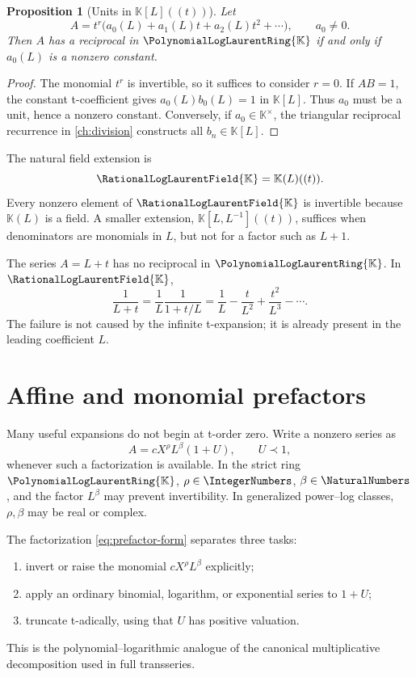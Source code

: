 \documentclass[11pt,openany]{book}
\theoremstyle{definition}
\theoremstyle{plain}
\newtheorem{proposition}{Proposition}[chapter]
\theoremstyle{remark}
\newcommand{\K}{\mathbb{K}}
\begin{document}
\begin{proposition}[{Units in \(\K[L]((t))\)}]\label{prop:units}
Let
\[
 A=t^r\bigl(a_0(L)+a_1(L)t+a_2(L)t^2+\cdots\bigr),
 \qquad a_0\ne0.
\]
Then \(A\) has a reciprocal in \(\PolynomialLogLaurentRing{\K}\) if and only if \(a_0(L)\) is a
nonzero constant.
\end{proposition}
\begin{proof}
The monomial \(t^r\) is invertible, so it suffices to consider \(r=0\).  If
\(AB=1\), the constant t-coefficient gives \(a_0(L)b_0(L)=1\) in
\(\K[L]\).  Thus \(a_0\) must be a unit, hence a nonzero constant.  Conversely,
if \(a_0\in\K^\times\), the triangular reciprocal recurrence in
\cref{ch:division} constructs all \(b_n\in\K[L]\).
\end{proof}

The natural field extension is
\begin{equation}\label{eq:rational-log-field}
 \RationalLogLaurentField{\K}=\K(L)((t)).
\end{equation}
Every nonzero element of \(\RationalLogLaurentField{\K}\) is invertible because \(\K(L)\) is a
field.  A smaller extension, \(\K[L,L^{-1}]((t))\), suffices when denominators
are monomials in \(L\), but not for a factor such as \(L+1\).

\begin{workedbox}
The series \(A=L+t\) has no reciprocal in \(\PolynomialLogLaurentRing{\K}\).  In \(\RationalLogLaurentField{\K}\),
\[
 \frac1{L+t}
 =\frac1L\frac1{1+t/L}
 =\frac1L-\frac{t}{L^2}+\frac{t^2}{L^3}-\cdots.
\]
The failure is not caused by the infinite t-expansion; it is already present in
the leading coefficient \(L\).
\end{workedbox}

\section{Affine and monomial prefactors}
Many useful expansions do not begin at t-order zero.  Write a nonzero series as
\begin{equation}\label{eq:prefactor-form}
 A=cX^\rho L^\beta(1+U),
 \qquad U\prec1,
\end{equation}
whenever such a factorization is available.  In the strict ring
\(\PolynomialLogLaurentRing{\K}\), \(\rho\in\IntegerNumbers\), \(\beta\in\NaturalNumbers\), and the factor \(L^\beta\) may
prevent invertibility.  In generalized power--log classes, \(\rho,\beta\) may be
real or complex.

The factorization \eqref{eq:prefactor-form} separates three tasks:
\begin{enumerate}
\item invert or raise the monomial \(cX^\rho L^\beta\) explicitly;
\item apply an ordinary binomial, logarithm, or exponential series to \(1+U\);
\item truncate t-adically, using that \(U\) has positive valuation.
\end{enumerate}
This is the polynomial--logarithmic analogue of the canonical multiplicative
decomposition used in full transseries.
\end{document}
